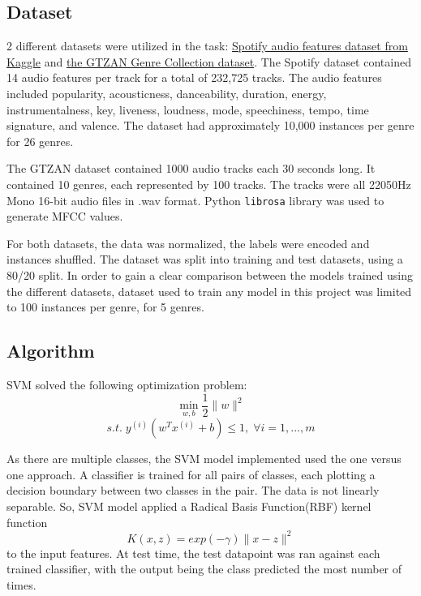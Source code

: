 \documentclass[11.5pt]{article}
\begin{document}
\subsection{Dataset}
2 different datasets were utilized in the task: \href{https://www.kaggle.com/zaheenhamidani/ultimate-spotify-tracks-db}{Spotify audio features dataset from Kaggle} and \href{http://marsyas.info/downloads/datasets.html}{the GTZAN Genre Collection dataset}. The Spotify dataset contained 14 audio features per track for a total of 232,725 tracks. The audio features included popularity, acousticness, danceability, duration, energy, instrumentalness, key, liveness, loudness, mode, speechiness, tempo, time signature, and valence. The dataset had approximately 10,000 instances per genre for 26 genres.  

The GTZAN dataset contained 1000 audio tracks each 30 seconds long. It contained 10 genres, each represented by 100 tracks. The tracks were all 22050Hz Mono 16-bit audio files in .wav format. Python \texttt{librosa} library was used to generate MFCC values.

For both datasets, the data was normalized, the labels were encoded and instances shuffled. The dataset was split into training and test datasets, using a 80/20 split. In order to gain a clear comparison between the models trained using the different datasets, dataset used to train any model in this project was limited to 100 instances per genre, for 5 genres. 


\subsection{Algorithm}

SVM solved the following optimization problem: 
\[\min_{w,b}\frac{1}{2}\|w\|^2\]
\[s.t. \; y^{(i)} (w^{T}x^{(i)}+b) \leq 1, \; \forall i = 1,..., m\]

As there are multiple classes, the SVM model implemented used the one versus one approach. A classifier is trained for all pairs of classes, each plotting a decision boundary between two classes in the pair. The data is not linearly separable. So, SVM model applied a Radical Basis Function(RBF) kernel function  
\[ K(x,z)=exp(-\gamma)\|x-z\|^2 \]
to the input features. At test time, the test datapoint was ran against each trained classifier, with the output being the class predicted the most number of times. 
\end{document}
